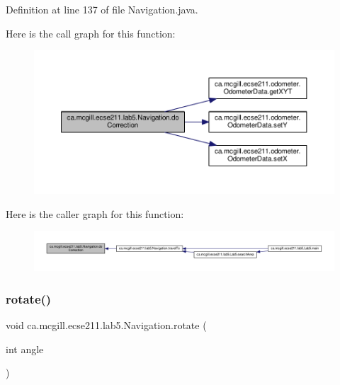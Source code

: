 Definition at line 137 of file Navigation.\+java.

Here is the call graph for this function\+:
\nopagebreak
\begin{figure}[H]
\begin{center}
\leavevmode
\includegraphics[width=350pt]{classca_1_1mcgill_1_1ecse211_1_1lab5_1_1_navigation_a73a89ddd822e0ba1cfd7a29c18aa7aea_cgraph}
\end{center}
\end{figure}
Here is the caller graph for this function\+:
\nopagebreak
\begin{figure}[H]
\begin{center}
\leavevmode
\includegraphics[width=350pt]{classca_1_1mcgill_1_1ecse211_1_1lab5_1_1_navigation_a73a89ddd822e0ba1cfd7a29c18aa7aea_icgraph}
\end{center}
\end{figure}
\mbox{\label{classca_1_1mcgill_1_1ecse211_1_1lab5_1_1_navigation_a5fcce0063a6b557d349a6fb5bf144c64}} 
\subsubsection{\texorpdfstring{rotate()}{rotate()}}
{\footnotesize\ttfamily void ca.\+mcgill.\+ecse211.\+lab5.\+Navigation.\+rotate (\begin{DoxyParamCaption}\item[{int}]{angle }\end{DoxyParamCaption})}

